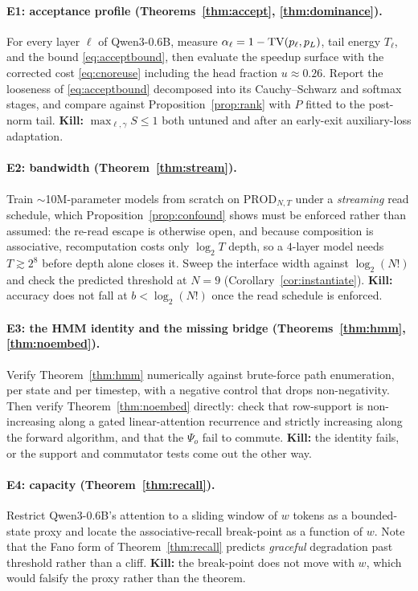 \paragraph{E1: acceptance profile (Theorems~\ref{thm:accept},
\ref{thm:dominance}).} For every layer $\ell$ of Qwen3-0.6B, measure
$\alpha_\ell = 1 - \mathrm{TV}(p_\ell,p_L)$, tail energy $T_\ell$, and the bound
\eqref{eq:acceptbound}, then evaluate the speedup surface with the corrected cost
\eqref{eq:cnoreuse} including the head fraction $u \approx 0.26$. Report the
looseness of \eqref{eq:acceptbound} decomposed into its Cauchy--Schwarz and
softmax stages, and compare against Proposition~\ref{prop:rank} with $P$ fitted
to the post-norm tail. \textbf{Kill:} $\max_{\ell,\gamma} S \le 1$ both untuned
and after an early-exit auxiliary-loss adaptation.

\paragraph{E2: bandwidth (Theorem~\ref{thm:stream}).} Train $\sim$10M-parameter
models from scratch on $\mathrm{PROD}_{N,T}$ under a \emph{streaming} read
schedule, which Proposition~\ref{prop:confound} shows must be enforced rather
than assumed: the re-read escape is otherwise open, and because composition is
associative, recomputation costs only $\log_2 T$ depth, so a $4$-layer model
needs $T \gtrsim 2^{8}$ before depth alone closes it. Sweep the interface width
against $\log_2(N!)$ and check the predicted threshold at $N = 9$
(Corollary~\ref{cor:instantiate}). \textbf{Kill:} accuracy does not fall at
$b < \log_2(N!)$ once the read schedule is enforced.

\paragraph{E3: the HMM identity and the missing bridge
(Theorems~\ref{thm:hmm}, \ref{thm:noembed}).} Verify Theorem~\ref{thm:hmm}
numerically against brute-force path enumeration, per state and per timestep, with
a negative control that drops non-negativity. Then verify
Theorem~\ref{thm:noembed} directly: check that row-support is non-increasing
along a gated linear-attention recurrence and strictly increasing along the
forward algorithm, and that the $\Psi_o$ fail to commute. \textbf{Kill:} the
identity fails, or the support and commutator tests come out the other way.

\paragraph{E4: capacity (Theorem~\ref{thm:recall}).} Restrict Qwen3-0.6B's
attention to a sliding window of $w$ tokens as a bounded-state proxy and locate
the associative-recall break-point as a function of $w$. Note that the Fano form
of Theorem~\ref{thm:recall} predicts \emph{graceful} degradation past threshold
rather than a cliff. \textbf{Kill:} the break-point does not move with $w$, which
would falsify the proxy rather than the theorem.

